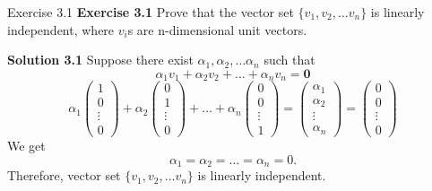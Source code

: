 \documentclass{beamer}
\begin{document}
\begin{frame}{Exercise 3.1}
    \textbf{Exercise 3.1} Prove that the vector set $\{ v_1, v_2,\dots v_n\}$ is linearly independent, where $v_i$s are n-dimensional unit vectors.
    \pause
    \par
    \textbf{Solution 3.1} Suppose there exist $\alpha_1,\alpha_2,\dots\alpha_n$ such that
    \begin{equation*}
        \alpha_1v_1+\alpha_2v_2+\dots+\alpha_nv_n=\mathbf{0}
    \end{equation*}
    \begin{equation*}
        \alpha_1\begin{pmatrix}
                    1\\ 0\\\vdots\\0
                \end{pmatrix}+\alpha_2\begin{pmatrix}
                    0\\ 1\\\vdots\\0
                \end{pmatrix}+\dots+\alpha_n\begin{pmatrix}
                    0\\ 0\\\vdots\\1
                \end{pmatrix}=\begin{pmatrix}
                    \alpha_1\\ \alpha_2\\ \vdots\\ \alpha_n
                \end{pmatrix}=\begin{pmatrix}
                    0\\ 0\\\vdots\\0
                \end{pmatrix}
    \end{equation*}
    We get 
    \begin{equation*}
        \alpha_1=\alpha_2=\dots=\alpha_n=0.
    \end{equation*}
    Therefore, vector set $\{ v_1, v_2,\dots v_n\}$ is linearly independent.
\end{frame}
\end{document}
